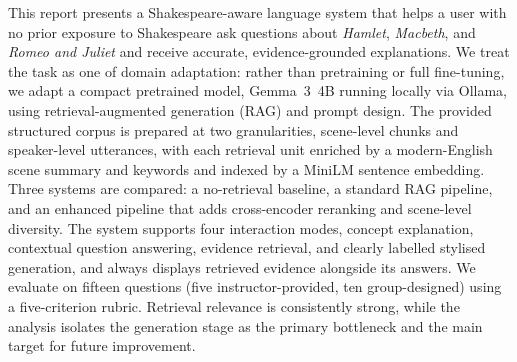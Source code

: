This report presents a Shakespeare-aware language system that helps a
user with no prior exposure to Shakespeare ask questions about
\emph{Hamlet}, \emph{Macbeth}, and \emph{Romeo and Juliet} and receive
accurate, evidence-grounded explanations. We treat the task as one of
domain adaptation: rather than pretraining or full fine-tuning, we adapt
a compact pretrained model, Gemma~3~4B running locally via Ollama, using
retrieval-augmented generation (RAG) and prompt design. The provided
structured corpus is prepared at two granularities, scene-level chunks
and speaker-level utterances, with each retrieval unit enriched by a
modern-English scene summary and keywords and indexed by a MiniLM
sentence embedding. Three systems are compared: a no-retrieval baseline,
a standard RAG pipeline, and an enhanced pipeline that adds
cross-encoder reranking and scene-level diversity. The system supports
four interaction modes, concept explanation, contextual question
answering, evidence retrieval, and clearly labelled stylised generation,
and always displays retrieved evidence alongside its answers. We
evaluate on fifteen questions (five instructor-provided, ten
group-designed) using a five-criterion rubric. Retrieval relevance is
consistently strong, while the analysis isolates the generation stage as
the primary bottleneck and the main target for future improvement.
